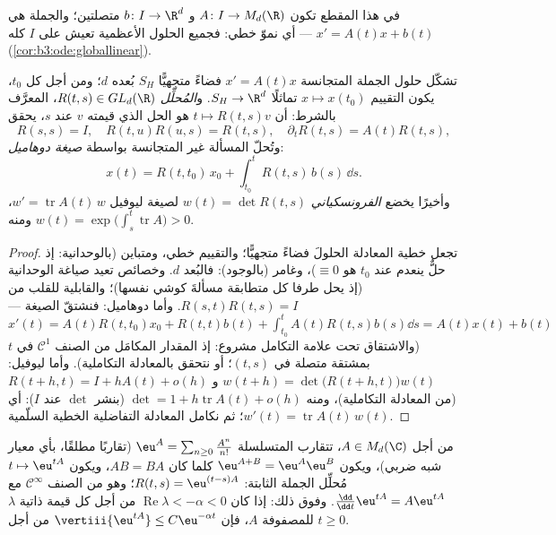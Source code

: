 في هذا المقطع تكون $A \colon I \to M_d(\R)$ و $b
\colon I \to \R^d$ متصلتين؛ والجملة هي $x' = A(t)x
+ b(t)$
--- أي نموّ خطي: فجميع الحلول الأعظمية تعيش على $I$ كله
(\cref{cor:b3:ode:globallinear}).

\begin{theorem}[البنية]\label{thm:b3:ode:linearstructure}
تشكّل حلول الجملة المتجانسة $x' = A(t)x$ فضاءً متجهيًّا $S_H$
بُعده $d$؛ ومن أجل كل $t_0$، يكون التقييم $x \mapsto x(t_0)$ تماثلًا $S_H \to
\R^d$.
و\emph{المُحلِّل} $R(t, s) \in GL_d(\R)$، المعرَّف
بالشرط: أن $t \mapsto R(t,
s)v$ هو الحل الذي قيمته $v$ عند $s$، يحقق
\[
R(s,s) = I,\quad R(t, u)R(u, s) = R(t, s),\quad
\partial_tR(t,s) = A(t)R(t,s),
\]
وتُحلّ المسألة غير المتجانسة بواسطة \emph{صيغة
دوهاميل}:
\[
x(t) = R(t, t_0)\,x_0 + \int_{t_0}^{t}R(t, s)\,b(s)\,\dd s .
\]
وأخيرًا يخضع \emph{الفرونسكياني} $w(t) = \det
R(t, s)$ لصيغة
ليوفيل $w' =
\operatorname{tr}A(t)\,w$، ومنه $w(t) =
\exp\bigl(\int_s^t\operatorname{tr}A\bigr) > 0$.
\end{theorem}

\begin{proof}
تجعل خطية المعادلة الحلولَ فضاءً متجهيًّا؛ والتقييم خطي،
ومتباين (بالوحدانية: إذ حلٌّ ينعدم عند $t_0$ هو $\equiv 0$)،
وغامر (بالوجود): فالبُعد $d$. وخصائص  تعيد صياغة
الوحدانية (إذ يحل طرفا كل متطابقة مسألةَ كوشي نفسها)؛ والقابلية
للقلب من $R(s,t)R(t,s) = I$. وأما دوهاميل: فنشتقّ الصيغة --- $x'(t) = A(t)R(t,t_0)x_0 + R(t,t)b(t) +
\int_{t_0}^tA(t)R(t,s)b(s)\dd s = A(t)x(t) + b(t)$ (والاشتقاق
تحت علامة التكامل مشروع: إذ المقدار المكامَل من الصنف
$\mathcal C^1$ في $t$ بمشتقة متصلة في $(t,s)$؛ أو نتحقق
بالمعادلة التكاملية). وأما ليوفيل: $w(t + h) = \det\bigl(R(t+h, t)\bigr)w(t)$ و $R(t + h, t) =
I + hA(t) + o(h)$ (من المعادلة
التكاملية)، ومنه $\det = 1
+ h\operatorname{tr}A(t) + o(h)$ (بنشر $\det$ عند $I$): أي $w'(t) = \operatorname{tr}A(t)\,w(t)$؛ ثم
نكامل المعادلة التفاضلية الخطية السلّمية.
\end{proof}

\begin{theorem}\label{thm:b3:ode:matrixexp}
من أجل $A \in M_d(\C)$، تتقارب المتسلسلة $\eu^{A} =
\sum_{n\geq0}\frac{A^n}{n!}$ (تقاربًا
مطلقًا، بأي معيار شبه ضربي)، ويكون $\eu^{A+B} = \eu^A\eu^B$ كلما كان $AB = BA$،
ويكون $t \mapsto \eu^{tA}$ مُحلِّل الجملة الثابتة: $R(t,s) = \eu^{(t-s)A}$؛ وهو من الصنف
$\mathcal
C^\infty$ مع $\frac{\dd}{\dd t}\eu^{tA} = A\eu^{tA}$. وفوق ذلك: إذا كان $\operatorname{Re}\lambda < -\alpha < 0$ من أجل كل قيمة ذاتية
$\lambda$ للمصفوفة $A$، فإن $\vertiii{\eu^{tA}}
\leq C\eu^{-\alpha t}$ من أجل $t \geq 0$.
\end{theorem}

